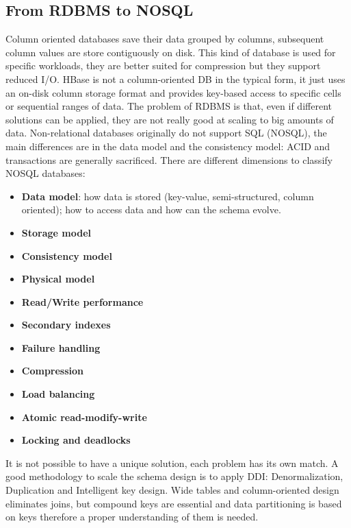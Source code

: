 	\subsection{From RDBMS to NOSQL}
	Column oriented databases save their data grouped by columns, subsequent column values are store contiguously on disk.\newline
	This kind of database is used for specific workloads, they are better suited for compression but they support reduced I/O.\newline
	HBase is not a column-oriented DB in the typical form, it just uses an on-disk column storage format and provides key-based access to specific cells or sequential ranges of data.\newline
	\newline
	The problem of RDBMS is that, even if different solutions can be applied, they are not really good at scaling to big amounts of data.\newline
	Non-relational databases originally do not support SQL (NOSQL), the main differences are in the data model and the consistency model: ACID and transactions are generally sacrificed.\newline
	There are different dimensions to classify NOSQL databases:
	\begin{itemize}
		\item \textbf{Data model}: how data is stored (key-value, semi-structured, column oriented); how to access data and how can the schema evolve.
		\item \textbf{Storage model}
		\item \textbf{Consistency model}
		\item \textbf{Physical model}
		\item \textbf{Read/Write performance}
		\item \textbf{Secondary indexes}
		\item \textbf{Failure handling}
		\item \textbf{Compression}
		\item \textbf{Load balancing}
		\item \textbf{Atomic read-modify-write}
		\item \textbf{Locking and deadlocks}
	\end{itemize}
	It is not possible to have a unique solution, each problem has its own match.\newline
	\newline
	A good methodology to scale the schema design is to apply DDI: Denormalization, Duplication and Intelligent key design. Wide tables and column-oriented design eliminates joins, but compound keys are essential and data partitioning is based on keys therefore a proper understanding of them is needed.
